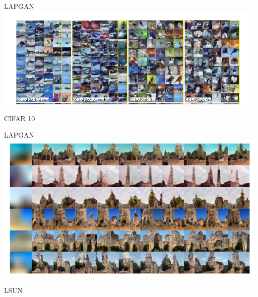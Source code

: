 \documentclass{beamer}
\begin{document}
\begin{frame}{LAPGAN}
\includegraphics[width=\textwidth]{./img/CIFAR-Lap.png}

CIFAR 10
\end{frame}



\begin{frame}{LAPGAN}
\includegraphics[width=\textwidth]{./img/LSUN.png}

LSUN
\end{frame}
\end{document}
